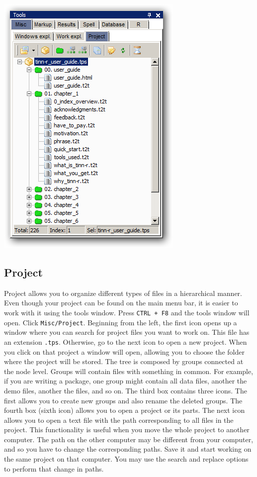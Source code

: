 \includegraphics[scale=0.50]{./res/tools_misc_project.png}

\subsection{Project}

Project allows you to organize different types of files in a hierarchical manner.
Even though your project can be found on the main menu bar, it is easier to work with it using the tools window.
Press \texttt{CTRL + F8} and the tools window will open. Click \texttt{Misc/Project}.
Beginning from the left, the first icon opens up a window where you can search for project files you want to work on.
This file has an extension \texttt{.tps}. Otherwise, go to the next icon to open a new project.
When you click on that project a window will open, allowing you to choose the folder where the project will be stored.
The tree is composed by groups connected at the node level. Groups will contain files with something in common.
For example, if you are writing a package, one group might contain all data files,
another the demo files, another the \RR{} files, and so on. The third box contains three icons.
The first allows you to create new groups and also rename the  deleted groups.
The fourth box (sixth icon) allows you to  open a project or its parts.
The next icon allows you to open a text file with the path corresponding to all files in the project.
This functionality is useful when you move the whole project to another computer.
The path on the other computer may be different from your computer, and so you have to change the corresponding paths.
Save it and start working on the same project on that computer.
You may use the search and replace options to perform that change in paths.

